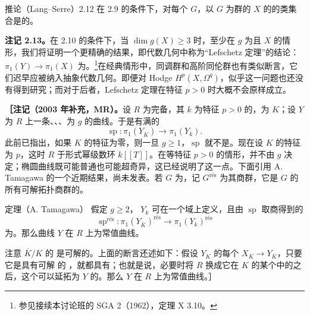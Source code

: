 \begin{SGAresult}{推论（Lang–Serre）}{2.12}
在 2.9 的条件下，对每个 $G$，以 $G$ 为群的 $X$ 的的类集合是的。
\end{SGAresult}
\textbf{注记 2.13。}在 2.10 的条件下，当 $\dim g(X)\geq3$ 时，至少在 $g$ 为且 $X$ 的情形，我们将证明一个更精确的结果，即代数几何中称为“Lefschetz 定理”的结论：$\pi_1(Y)\to\pi_1(X)$ 为。\footnote{参见接续本讨论班的 SGA 2（1962），定理 X 3.10。}在经典情形中，同调群和高阶同伦群也有类似断言，它们迟早应被纳入抽象代数几何。即便对 Hodge  $H^p(X,\Omega^q)$，似乎这一问题也还没有得到研究；而对于后者，Lefschetz 定理在特征 $p>0$ 时大概不会原样成立。

\textbf{［注记（2003 年补充，MR）。}设 $R$ 为完备，其 $k$ 为特征 $p>0$ 的，为 $K$；设 $Y$ 为 $R$ 上一条、、、为 $g$ 的曲线。于是有满的
\[
\operatorname{sp}:\pi_1(Y_{\overline K})\longrightarrow\pi_1(Y_k).
\]
此前已指出，如果 $K$ 的特征为零，则一旦 $g\geq1$，$\operatorname{sp}$ 就不是。现在设 $K$ 的特征为 $p$，这时 $R$ 于形式幂级数环 $k[[T]]$。在等特征 $p>0$ 的情形，并不由 $g$ 决定；椭圆曲线既可能普通也可能超奇异，这已经说明了这一点。下面引用 A. Tamagawa 的一个近期结果，尚未发表。若 $G$ 为，记 $G^{\mathrm{rés}}$ 为其商群，它是 $G$ 的所有可解拓扑商群的。

\begin{SGAresult}{定理（A. Tamagawa）}{}
假定 $g\geq2$， $Y_k$ 可在一个域上定义，且由 $\operatorname{sp}$ 取商得到的
\[
\operatorname{sp}^{\mathrm{rés}}:\pi_1(Y_{\overline K})^{\mathrm{rés}}
\longrightarrow\pi_1(Y_k)^{\mathrm{rés}}
\]
为。那么曲线 $Y$ 在 $R$ 上为常值曲线。
\end{SGAresult}
注意 $\overline K/K$ 的 是可解的。上面的断言还述如下：假设 $Y_K$ 的每个 $X_K\to Y_K$，只要它是具有可解 的 ，就都具有；也就是说，必要时将 $R$ 换成它在 $K$ 的某个中的之后，这个可以延拓为 $Y$ 的。那么 $Y$ 在 $R$ 上为常值曲线。］

